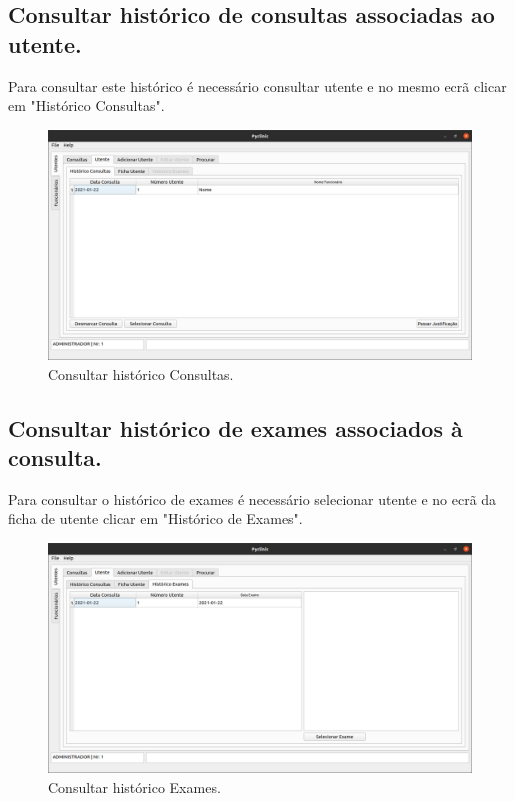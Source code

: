 \documentclass[11pt,a4paper,twoside]{article}
\begin{document}
\subsection{Consultar histórico de consultas associadas ao utente.}
Para consultar este histórico é necessário consultar utente e no mesmo ecrã clicar em "Histórico Consultas".

\begin{figure}[H]
	\centering
	\includegraphics[width=0.9\linewidth]{image/admin/historicoConsultas.png}
	\caption{Consultar histórico Consultas.}
	\label{fig:historicoconsulta}
\end{figure}

\subsection{Consultar histórico de exames associados à consulta.}
Para consultar o histórico de exames é necessário selecionar utente e no ecrã da ficha de utente clicar em "Histórico de Exames".

\begin{figure}[H]
	\centering
	\includegraphics[width=0.9\linewidth]{image/admin/historicoExames.png}
	\caption{Consultar histórico Exames.}
	\label{fig:historicoexame}
\end{figure}
\end{document}
